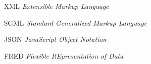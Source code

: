 \begin{siglas}
  \item[XML] \textit{Extensible Markup Language}
  \item[SGML] \textit{Standard Generalized Markup Language}
  \item[JSON] \textit{JavaScript Object Notation}
  \item[FRED] \textit{Flexible REpresentation of Data}
\end{siglas}
